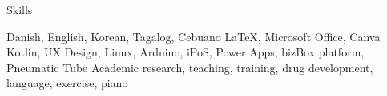 \begin{rubric}{\faStar[solid] Skills}

\entry*[Languages][\faLanguage]
	Danish, English, Korean, Tagalog, Cebuano
\entry*[Productivity][\faCode]
	\LaTeX, Microsoft Office, Canva
\entry*[Technologies][\faTerminal]
	Kotlin, UX Design, Linux, Arduino, iPoS, Power Apps, bizBox platform, Pneumatic Tube
\entry*[Misc.][\faUser]
	Academic research, teaching, training, drug development, language, exercise, piano
\end{rubric}